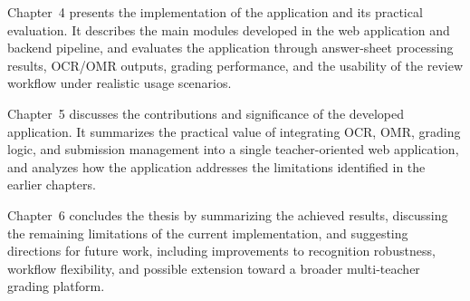 \documentclass[../Main.tex]{subfiles}
\begin{document}
Chapter~4 presents the implementation of the application and its practical evaluation.
It describes the main modules developed in the web application and backend
pipeline, and evaluates the application through answer-sheet processing results,
OCR/OMR outputs, grading performance, and the usability of the review workflow
under realistic usage scenarios.

Chapter~5 discusses the contributions and significance of the developed application.
It summarizes the practical value of integrating OCR, OMR, grading logic, and
submission management into a single teacher-oriented web application, and
analyzes how the application addresses the limitations identified in the earlier chapters.

Chapter~6 concludes the thesis by summarizing the achieved results, discussing the
remaining limitations of the current implementation, and suggesting directions for
future work, including improvements to recognition robustness, workflow
flexibility, and possible extension toward a broader multi-teacher grading platform.
\end{document}
